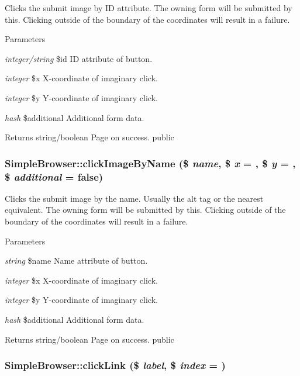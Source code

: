 Clicks the submit image by ID attribute. The owning form will be submitted by this. Clicking outside of the boundary of the coordinates will result in a failure. 
\begin{DoxyParams}{Parameters}
\item[{\em integer/string}]\$id ID attribute of button. \item[{\em integer}]\$x X-\/coordinate of imaginary click. \item[{\em integer}]\$y Y-\/coordinate of imaginary click. \item[{\em hash}]\$additional Additional form data. \end{DoxyParams}
\begin{DoxyReturn}{Returns}
string/boolean Page on success.  public 
\end{DoxyReturn}
\hypertarget{class_simple_browser_ad65bf114e79f0cdbcfab9f995ff4b5dd}{
\subsubsection[{clickImageByName}]{\setlength{\rightskip}{0pt plus 5cm}SimpleBrowser::clickImageByName (\$ {\em name}, \/  \$ {\em x} = {}, \/  \$ {\em y} = {}, \/  \$ {\em additional} = {\ttfamily false})}}
\label{class_simple_browser_ad65bf114e79f0cdbcfab9f995ff4b5dd}
Clicks the submit image by the name. Usually the alt tag or the nearest equivalent. The owning form will be submitted by this. Clicking outside of the boundary of the coordinates will result in a failure. 
\begin{DoxyParams}{Parameters}
\item[{\em string}]\$name Name attribute of button. \item[{\em integer}]\$x X-\/coordinate of imaginary click. \item[{\em integer}]\$y Y-\/coordinate of imaginary click. \item[{\em hash}]\$additional Additional form data. \end{DoxyParams}
\begin{DoxyReturn}{Returns}
string/boolean Page on success.  public 
\end{DoxyReturn}
\hypertarget{class_simple_browser_a133bb64ab68f9d973f30be9de9d7120a}{
\subsubsection[{clickLink}]{\setlength{\rightskip}{0pt plus 5cm}SimpleBrowser::clickLink (\$ {\em label}, \/  \$ {\em index} = {})}}

